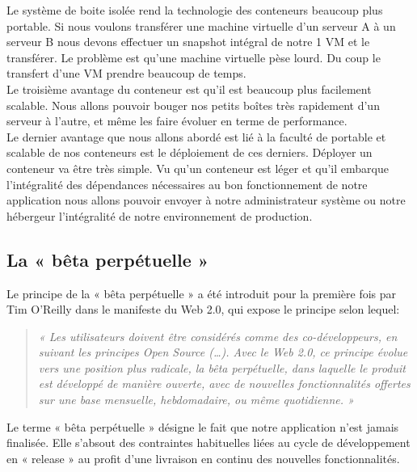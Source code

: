 \documentclass{report}
\begin{document}
        Le système de boite isolée rend la technologie des conteneurs beaucoup plus portable. Si nous voulons transférer une machine virtuelle d’un serveur A à un serveur B nous devons effectuer un snapshot intégral de notre 1 VM et le transférer. Le problème est qu’une machine virtuelle pèse lourd. Du coup le transfert d’une VM prendre beaucoup de temps.\\

        Le troisième avantage du conteneur est qu’il est beaucoup plus facilement scalable. Nous allons pouvoir bouger nos petits boîtes très rapidement d’un serveur à l’autre, et même les faire évoluer en terme de performance.\\

        Le dernier avantage que nous allons abordé est lié à la faculté de portable et scalable de nos conteneurs est le déploiement de ces derniers. Déployer un conteneur va être très simple. Vu qu’un conteneur est léger et qu’il embarque l’intégralité des dépendances nécessaires au bon fonctionnement de notre application nous allons pouvoir envoyer à notre administrateur système ou notre hébergeur l’intégralité de notre environnement de production.

      \subsection{La « bêta perpétuelle »}
      Le principe de la « bêta perpétuelle » a été introduit pour la première fois par Tim O’Reilly dans le manifeste du Web 2.0, qui expose le principe selon lequel:\\
      \begin{quotation}
        \emph{« Les utilisateurs doivent être considérés comme des co-développeurs, en suivant les principes Open Source (…). Avec le Web 2.0, ce principe évolue vers une position plus radicale, la bêta perpétuelle, dans laquelle le produit est développé de manière ouverte, avec de nouvelles fonctionnalités offertes sur une base mensuelle, hebdomadaire, ou même quotidienne. »}\\
      \end{quotation}

      Le terme « bêta perpétuelle » désigne le fait que notre application n’est jamais finalisée. Elle s’absout des contraintes habituelles liées au cycle de développement en « release » au profit d’une livraison en continu des nouvelles fonctionnalités.
\end{document}
